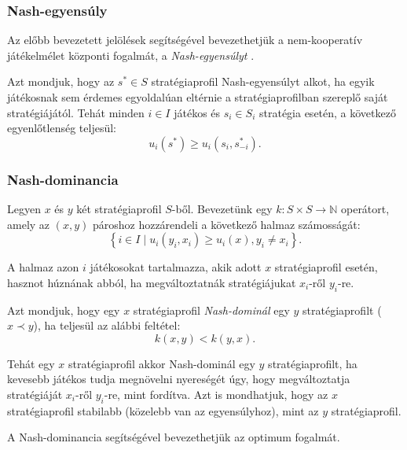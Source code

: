 \subsubsection{Nash-egyensúly}
Az előbb bevezetett jelölések segítségével bevezethetjük a nem-kooperatív játékelmélet központi fogalmát, a \emph{Nash-egyensúlyt} \cite{nash1951non}.

\begin{ert}
  Azt mondjuk, hogy az $s^* \in S$ stratégiaprofil Nash-egyensúlyt alkot,
  ha egyik játékosnak sem érdemes egyoldalúan eltérnie a stratégiaprofilban szereplő saját stratégiájától.
  Tehát minden $i \in I$ játékos és $s_i \in S_i$ stratégia esetén, a következő egyenlőtlenség teljesül:
  \[
    u_i\left(s^*\right) \ge u_i\left(s_i, s_{-i}^*\right).
  \]
\end{ert}


\subsubsection{Nash-dominancia}\label{subsubsec:NASH_DOMINANCIA}
Legyen $x$ és $y$ két stratégiaprofil $S$-ből.
Bevezetünk egy $k \colon S \times S \to \mathbb{N}$ operátort, amely az $\left( x, y \right)$ pároshoz hozzárendeli a következő halmaz számosságát:
\[
  \left\{ i \in I \mid u_i(y_i, x_i) \ge u_i(x), y_i \neq x_i \right\}.
\]

A halmaz azon $i$ játékosokat tartalmazza, akik adott $x$ stratégiaprofil esetén, hasznot húznának abból, ha megváltoztatnák stratégiájukat $x_i$-ről $y_i$-re.

\begin{ert}
  Azt mondjuk, hogy egy $x$ stratégiaprofil \emph{Nash-dominál} egy $y$ stratégiaprofilt ($x \prec y$), ha teljesül az alábbi feltétel:
  \begin{equation}\label{eqn:NASH_DOMINANCIA}
    k(x,y) < k(y, x).
  \end{equation}
\end{ert}

Tehát egy $x$ stratégiaprofil akkor Nash-dominál egy $y$ stratégiaprofilt, ha kevesebb játékos tudja megnövelni nyereségét úgy, hogy megváltoztatja stratégiáját $x_i$-ről $y_i$-re, mint fordítva.
Azt is mondhatjuk, hogy az $x$ stratégiaprofil stabilabb (közelebb van az egyensúlyhoz), mint az $y$ stratégiaprofil.


A Nash-dominancia segítségével bevezethetjük az optimum fogalmát.

